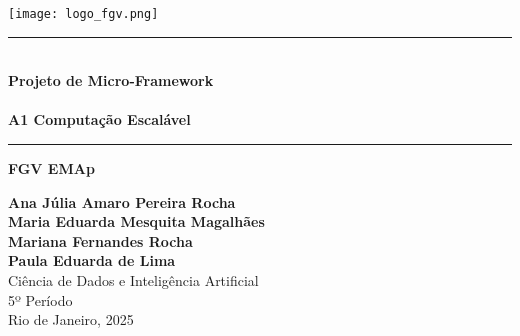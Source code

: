\documentclass[a4paper,12pt]{article}
\begin{document}
\begin{titlepage}
    \begin{center}

        \vspace{1cm}
        \begin{minipage}{0.45\textwidth}
            \centering
            \texttt{[image: logo\_fgv.png]}    
        \end{minipage}
        \vspace{2cm}

        \rule{1\textwidth}{0.4pt} \\ %
        \vspace{0.3cm}
        {\Huge \textbf{Projeto de Micro-Framework}} \\
        \vspace{0.2cm}
        \vspace{0.5cm}\\
        {\Large \textbf{A1 Computação Escalável}}\\
        \rule{1\textwidth}{0.4pt} %


        \vspace{0.5cm}
        {\Large \textbf{FGV EMAp}} \\
        \vspace{2cm}
        
        

        
        
        
        {\large 
            \textbf{Ana Júlia Amaro Pereira Rocha} \\ 
            \textbf{Maria Eduarda Mesquita Magalhães}\\
            \textbf{Mariana Fernandes Rocha} \\
            \textbf{Paula Eduarda de Lima}}\\[1.5cm]
        
        {\large 
            Ciência de Dados e Inteligência Artificial \\ 
            5º Período}\\[2cm]
        
        \vfill
        {\large Rio de Janeiro, 2025}

        
    \end{center}
\end{titlepage}
\end{document}
